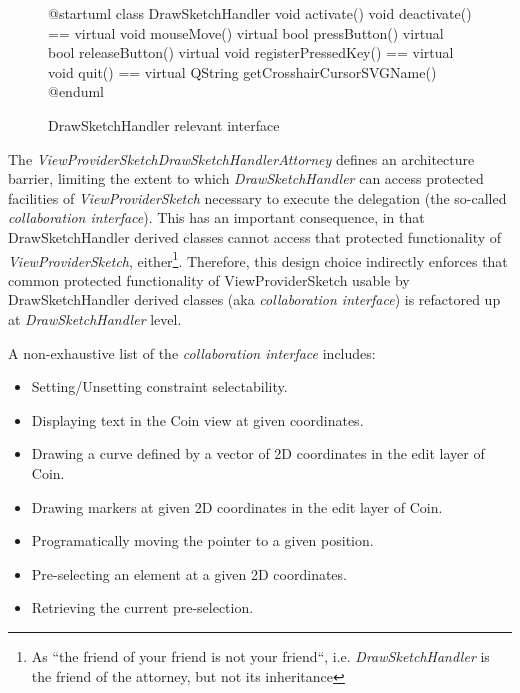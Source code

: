 \documentclass[12pt,twoside,a4paper]{book}
\newcommand{\DrawSketchHandler}{\emph{DrawSketchHandler}}
\newcommand{\ViewProviderSketch}{\emph{ViewProviderSketch}}
\begin{document}
   \begin{figure}
    \centering
    \caption{DrawSketchHandler relevant interface}
        \begin{plantuml}
        @startuml
        class DrawSketchHandler {
            void activate()
            void deactivate()
            ==
            virtual void mouseMove()
            virtual bool pressButton()
            virtual bool releaseButton()
            virtual void registerPressedKey()
            ==
            virtual void quit()
            ==
            virtual QString getCrosshairCursorSVGName()
        }
        @enduml
        \end{plantuml}
    \end{figure}

    The \emph{ViewProviderSketchDrawSketchHandlerAttorney} defines an architecture barrier, limiting the extent to which \DrawSketchHandler{} can access protected facilities of \ViewProviderSketch{} necessary to execute the delegation (the so-called \emph{collaboration interface}). This has an important consequence, in that DrawSketchHandler derived classes cannot access that protected functionality of \ViewProviderSketch{}, either\footnote{As ``the friend of your friend is not your friend``, i.e. \DrawSketchHandler{} is the friend of the attorney, but not its inheritance}. Therefore, this design choice indirectly enforces that common protected functionality of ViewProviderSketch usable by DrawSketchHandler derived classes (aka \emph{collaboration interface}) is refactored up at \DrawSketchHandler{} level.

    A non-exhaustive list of the \emph{collaboration interface} includes:

    \begin{itemize}
     \item Setting/Unsetting constraint selectability.
     \item Displaying text in the Coin view at given coordinates.
     \item Drawing a curve defined by a vector of 2D coordinates in the edit layer of Coin.
     \item Drawing markers at given 2D coordinates in the edit layer of Coin.
     \item Programatically moving the pointer to a given position.
     \item Pre-selecting an element at a given 2D coordinates.
     \item Retrieving the current pre-selection.
    \end{itemize}
\end{document}
